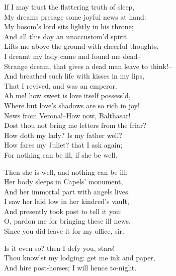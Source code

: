  
\begin{speech}
If I may trust the flattering truth of sleep, \\
My dreams presage some joyful news at hand: \\
My bosom's lord sits lightly in his throne; \\
And all this day an unaccustom'd spirit \\
Lifts me above the ground with cheerful thoughts. \\
I dreamt my lady came and found me dead-- \\
Strange dream, that gives a dead man leave to think!-- \\
And breathed such life with kisses in my lips, \\
That I revived, and was an emperor. \\
Ah me! how sweet is love itself possess'd, \\
Where but love's shadows are so rich in joy! 
\\
News from Verona!--How now, Balthasar! \\
Dost thou not bring me letters from the friar? \\
How doth my lady? Is my father well? \\
How fares my Juliet? that I ask again; \\
For nothing can be ill, if she be well. \\
\end{speech}
\begin{speech}
Then she is well, and nothing can be ill: \\
Her body sleeps in Capels' monument, \\
And her immortal part with angels lives. \\
I saw her laid low in her kindred's vault, \\
And presently took post to tell it you: \\
O, pardon me for bringing these ill news, \\
Since you did leave it for my office, sir. \\
\end{speech}
\begin{speech}
Is it even so? then I defy you, stars! \\
Thou know'st my lodging: get me ink and paper, \\
And hire post-horses; I will hence to-night. \\
\end{speech}
